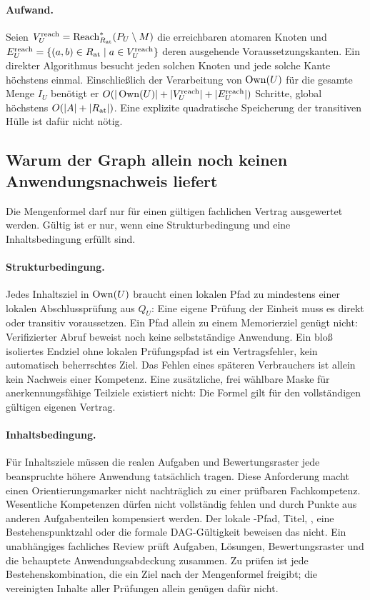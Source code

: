 \paragraph{Aufwand.}
Seien $V_U^{\mathrm{reach}}=
\operatorname{Reach}_{R_{\mathrm{at}}}^{*}(P_U\setminus M)$ die erreichbaren
atomaren Knoten und
$E_U^{\mathrm{reach}}=\{(a,b)\in R_{\mathrm{at}}\mid
a\in V_U^{\mathrm{reach}}\}$ deren ausgehende Voraussetzungskanten.
Ein direkter Algorithmus besucht jeden solchen Knoten und jede solche Kante
höchstens einmal. Einschließlich der Verarbeitung von $\operatorname{Own}(U)$ für die
gesamte Menge $I_U$ benötigt er
$O(|\operatorname{Own}(U)|+|V_U^{\mathrm{reach}}|+|E_U^{\mathrm{reach}}|)$ Schritte,
global höchstens $O(|A|+|R_{\mathrm{at}}|)$. Eine explizite quadratische
Speicherung der transitiven Hülle ist dafür nicht nötig.

\subsection{Warum der Graph allein noch keinen Anwendungsnachweis liefert}
Die Mengenformel darf nur für einen gültigen fachlichen Vertrag ausgewertet
werden. Gültig ist er nur, wenn eine Strukturbedingung und eine
Inhaltsbedingung erfüllt sind.

\paragraph{Strukturbedingung.}
Jedes Inhaltsziel in $\operatorname{Own}(U)$ braucht einen lokalen Pfad zu
mindestens einer lokalen Abschlussprüfung aus $Q_U$: Eine eigene Prüfung
der Einheit muss es direkt oder transitiv voraussetzen. Ein Pfad allein
zu einem Memorierziel genügt nicht: Verifizierter Abruf beweist noch keine
selbstständige Anwendung. Ein bloß isoliertes
Endziel ohne lokalen Prüfungspfad ist ein Vertragsfehler, kein automatisch
beherrschtes Ziel. Das Fehlen eines späteren Verbrauchers ist allein
kein Nachweis einer Kompetenz.
Eine zusätzliche, frei wählbare Maske für \glqq anerkennungsfähige\grqq{}
Teilziele existiert nicht: Die Formel gilt für den vollständigen gültigen
eigenen Vertrag.

\paragraph{Inhaltsbedingung.}
Für Inhaltsziele müssen die realen Aufgaben und
Bewertungsraster jede beanspruchte höhere Anwendung tatsächlich tragen.
Diese Anforderung macht einen Orientierungsmarker nicht nachträglich
zu einer prüfbaren Fachkompetenz. Wesentliche Kompetenzen dürfen nicht
vollständig fehlen und durch Punkte aus anderen Aufgabenteilen kompensiert
werden.
Der lokale -Pfad, Titel, , eine
Bestehenspunktzahl oder die formale DAG-Gültigkeit beweisen das nicht.
Ein unabhängiges fachliches Review prüft Aufgaben, Lösungen, Bewertungsraster
und die behauptete Anwendungsabdeckung zusammen. Zu prüfen ist jede
Bestehenskombination, die ein Ziel nach der Mengenformel freigibt; die
vereinigten Inhalte aller Prüfungen allein genügen dafür nicht.

